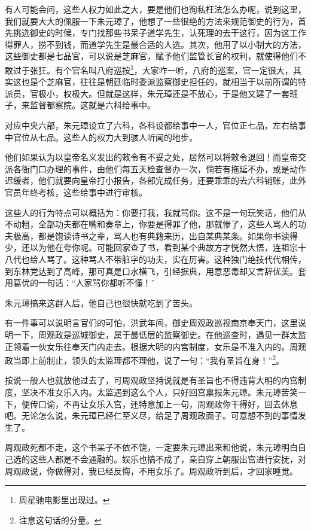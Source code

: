 \begin{multicols}{\theparacolNo}
		有人可能会问，这些人权力如此之大，要是他们也徇私枉法怎么办呢，说到这里，我们就要大大的佩服一下朱元璋了，他想了一些很绝的方法来规范御史的行为，首先挑选御史的时候，专门找那些书呆子道学先生，认死理的去干这行，因为这工作得罪人，捞不到钱，而道学先生是最合适的人选。其次，他用了以小制大的方法，这些御史都是七品官，可以说是芝麻官，赋予他们监管长官的权利，就使得他们不敢过于张狂。有个官名叫八府巡按\footnote{周星驰电影里出现过。}，大家咋一听，八府的巡案，官一定很大，其实这也是个芝麻官，往往是朝廷临时委派监察御史担任的，就相当于以前所谓的特派员，官极小，权极大。但就是这样，朱元璋还是不放心，于是他又建了一套班子，来监督都察院。这就是六科给事中。

		对应中央六部，朱元璋设立了六科，各科设都给事中一人，官位正七品，左右给事中官位从七品。这些人的权力大到骇人听闻的地步。

		他们如果认为以皇帝名义发出的敕令有不妥之处，居然可以将敕令退回！而皇帝交派各衙门口办理的事件，由他们每五天检查督办一次，倘若有拖延不办，或是动作迟缓者，他们就要向皇帝打小报告，各部完成任务，还要乖乖的去六科销账，此外官员年终考核，这些给事中进行审核。

		这些人的行为特点可以概括为：你要打我，我就骂你。这不是一句玩笑话，他们从不动粗，全部功夫都在嘴和奏章上，你要是得罪了他，那就惨了，这些人骂人的功夫极高，都是饱读诗书之辈，骂人也有典籍来历，出自某典某条。如果你书读得少，还以为他在夸你呢。可能回家查了书，看到某个典故方才恍然大悟，连祖宗十八代也给人骂了。这种骂人不带脏字的功夫，实在厉害。这种独门绝技代代相传，到东林党达到了高峰，那可真是口水横飞，引经据典，用意恶毒却又言辞优美。套用葛优的一句话：“人家骂你都听不懂！”

		朱元璋搞来这群人后，他自己也很快就吃到了苦头。

		有一件事可以说明言官们的可怕，洪武年间，御史周观政巡视南京奉天门，这里说明一下，周观政是巡城御史，属于最低层的监察御史。在他巡查时，遇见一群太监正领着一伙女乐往奉天门内走去。根据大明的内宫制度，女乐是不准入内的。周观政当即上前制止，领头的太监理都不理他，说了一句：“我有圣旨在身！”\footnote{注意这句话的分量。}。

		按说一般人也就放他过去了，可周观政坚持说就是有圣旨也不得违背大明的内宫制度，坚决不准女乐入内。太监遇到这么个人，只好回宫禀报朱元璋。朱元璋苦笑一下，便传口谕，不再让女乐入宫，还特意加上一句，周观政你干得好，回去休息吧。无论怎么说，朱元璋已经仁至义尽，给足了周观政面子。可意想不到的事情发生了。

		周观政死都不走，这个书呆子不依不饶，一定要朱元璋出来和他说，朱元璋明白自己选的这些人都是不会通融的。娱乐也搞不成了，亲自穿上朝服出宫进行安抚，对周观政说，你做得对，我已经反悔，不用女乐了。周观政听到后，才回家睡觉。


\end{multicols}

